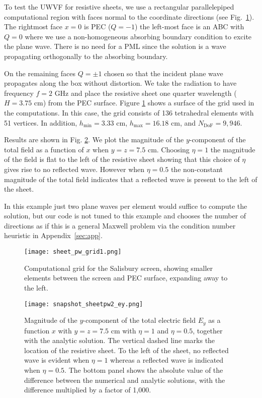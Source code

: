 \documentclass[a4paper,12pt]{article}
\newcommand{\Ndof}{N_{\mathrm{DoF}}}
\begin{document}
To test the UWVF for resistive sheets,  we use a rectangular parallelepiped computational region with faces normal to the coordinate directions (see Fig.~\ref{fig:sheetpw_grid}).  The rightmost face $x=0$ is PEC ($Q=-1$) the left-most face is an ABC with $Q=0$ where we use a non-homogeneous absorbing boundary condition to excite the plane wave. There is no need for a PML since the solution is a wave propagating orthogonally to the absorbing boundary.

 On the remaining faces $Q=\pm 1$ chosen so that the incident plane wave propagates along the box without distortion. We take the radiation to have frequency $f=2$ GHz and place the  resistive sheet one quarter wavelength ($H=3.75$ cm) from the PEC surface.  Figure \ref{fig:sheetpw_grid} shows a surface of the grid used in the computations. In this case, the grid consists of 136 tetrahedral elements with 51 vertices. In addition, $h_{\min} = 3.33$ cm, $h_{\max} =  16.18$ cm, and $\Ndof=9,946$.

Results are shown in Fig. \ref{fig:sheetpw_snap}.  We plot the magnitude of the $y$-component of the total field as a function of $x$ when  $y=z=7.5$ cm.  Choosing $\eta=1$ the magnitude of the field is flat to the left of the resistive sheet  showing that this choice of $\eta$ gives rise to no reflected wave.  However when $\eta=0.5$ the non-constant magnitude of the total field indicates that a reflected wave is present to the left of the sheet. 

In this example just two plane waves per element would suffice to
compute the solution, but our code is not tuned to this example and
chooses the number of directions as if this is a general Maxwell
problem via the condition number heuristic in
Appendix~\ref{sec:app}. 
\begin{figure}[!htb]
    \centering
    \texttt{[image: sheet\_pw\_grid1.png]} 
\caption{Computational grid for the Salisbury screen, showing smaller elements between the screen and PEC surface, expanding away to the left.}
    \label{fig:sheetpw_grid}
\end{figure}

\begin{figure}[!htb]
    \centering
\texttt{[image: snapshot\_sheetpw2\_ey.png]} 
\caption{Magnitude of the $y$-component of the total electric field
  $E_y$ as a function $x$ with $y=z=7.5$ cm with $\eta=1$ and
  $\eta=0.5$, together with the analytic solution.  The vertical
  dashed line marks the location of the resistive sheet.  To the left
  of the sheet, no reflected wave is evident when $\eta=1$ whereas a
  reflected wave is indicated when $\eta=0.5$. The bottom panel shows
  the absolute value of the difference between the numerical and
  analytic solutions, with the difference multiplied by a factor of
  1,000.}
    \label{fig:sheetpw_snap}
\end{figure}
\end{document}
